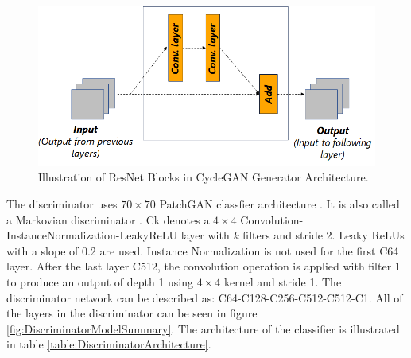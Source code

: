 \begin{figure}[H]
        \begin{center}
	    \includegraphics[scale=0.50]{images/Implementation/resnetBlocks.png}
	    \caption[Illustration of ResNet Blocks in \ac{CycleGAN} Generator Architecture.]{Illustration of ResNet Blocks in \ac{CycleGAN} Generator Architecture.}
	    \label{fig:resnetBlock}
	    \end{center}
\end{figure}


The discriminator uses $70 \times 70$ PatchGAN classfier architecture \cite{isola2018imagetoimage}. It is also called a Markovian discriminator \cite{li2016precomputed}. {\selectfont Ck} denotes a $4 \times 4$ Convolution-InstanceNormalization-LeakyReLU layer with $k$ filters and stride 2. Leaky ReLUs with a slope of 0.2 are used. Instance Normalization is not used for the first {\selectfont C64} layer. After the last layer {\selectfont C512}, the convolution operation is applied with filter 1 to produce an output of depth 1 using $4 \times 4$ kernel and stride 1. The discriminator network can be described as: {\selectfont C64-C128-C256-C512-C512-C1}. All of the layers in the discriminator can be seen in figure \ref{fig:DiscriminatorModelSummary}. The architecture of the classifier is illustrated in table \ref{table:DiscriminatorArchitecture}.


